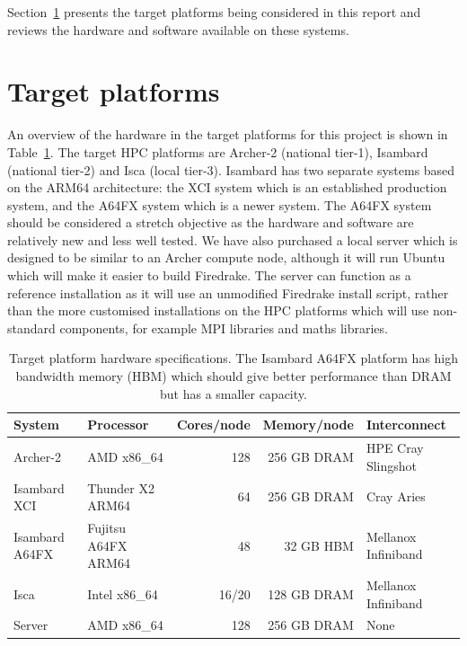 \documentclass[a4paper,titlepage]{article}
\begin{document}
Section~\ref{section:target_platforms} presents the target platforms being considered in this report and reviews the hardware and software available on these systems. 

\section{Target platforms}
\label{section:target_platforms}

An overview of the hardware in the target platforms for this project is shown in Table~\ref{tab:hardware}. The target HPC platforms are Archer-2 (national tier-1), Isambard (national tier-2) and Isca (local tier-3). Isambard has two separate systems based on the ARM64 architecture: the XCI system which is an established production system, and the A64FX system which is a newer system. The A64FX system should be considered a stretch objective as the hardware and software are relatively new and less well tested. We have also purchased a local server which is designed to be similar to an Archer compute node, although it will run Ubuntu which will make it easier to build Firedrake. The server can function as a reference installation as it will use an unmodified Firedrake install script, rather than the more customised installations on the HPC platforms which will use non-standard components, for example MPI libraries and maths libraries. 
%
\begin{table}[htp]
\begin{center}
\begin{tabular}{|l|l|r|r|l|}
\hline 
System         & Processor        & Cores/node & Memory/node     & Interconnect \\
\hline
Archer-2       & AMD x86\_64         & 128        & 256 GB DRAM  & HPE Cray Slingshot  \\
Isambard XCI   & Thunder X2 ARM64    &  64        & 256 GB DRAM  & Cray Aries          \\
Isambard A64FX & Fujitsu A64FX ARM64 & 48         & 32 GB HBM    & Mellanox Infiniband \\
Isca           & Intel x86\_64       & 16/20      & 128 GB DRAM  & Mellanox Infiniband \\
Server         & AMD x86\_64         & 128        & 256 GB DRAM  & None                \\
\hline
\end{tabular}
\end{center}
\caption{Target platform hardware specifications. The Isambard A64FX platform has high bandwidth memory (HBM) which should give better performance than DRAM but has a smaller capacity.}
\label{tab:hardware}
\end{table}%
\end{document}
